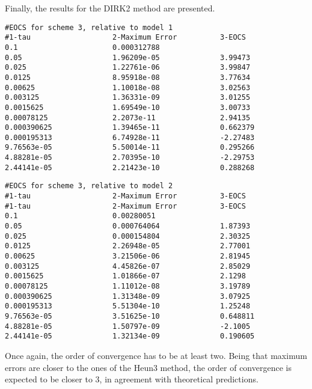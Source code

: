 \documentclass[11pt]{article}
\theoremstyle{theorem}
\theoremstyle{definition}
\begin{document}
Finally, the results for the DIRK2 method are presented.\\

\begin{lstlisting}
#EOCS for scheme 3, relative to model 1
#1-tau                   2-Maximum Error          3-EOCS                   
0.1                      0.000312788              	
0.05                     1.96209e-05              3.99473
0.025                    1.22761e-06              3.99847
0.0125                   8.95918e-08              3.77634
0.00625                  1.10018e-08              3.02563
0.003125                 1.36331e-09              3.01255
0.0015625                1.69549e-10              3.00733
0.00078125               2.2073e-11               2.94135
0.000390625              1.39465e-11              0.662379
0.000195313              6.74928e-11              -2.27483
9.76563e-05              5.50014e-11              0.295266
4.88281e-05              2.70395e-10              -2.29753
2.44141e-05              2.21423e-10              0.288268
\end{lstlisting}

\begin{lstlisting}
#EOCS for scheme 3, relative to model 2
#1-tau                   2-Maximum Error          3-EOCS                   
#1-tau                   2-Maximum Error          3-EOCS                   
0.1                      0.00280051               	
0.05                     0.000764064              1.87393
0.025                    0.000154804              2.30325
0.0125                   2.26948e-05              2.77001
0.00625                  3.21506e-06              2.81945
0.003125                 4.45826e-07              2.85029
0.0015625                1.01866e-07              2.1298
0.00078125               1.11012e-08              3.19789
0.000390625              1.31348e-09              3.07925
0.000195313              5.51304e-10              1.25248
9.76563e-05              3.51625e-10              0.648811
4.88281e-05              1.50797e-09              -2.1005
2.44141e-05              1.32134e-09              0.190605
\end{lstlisting}

Once again, the order of convergence has to be at least two. Being that maximum errors are closer to the ones of the Heun3 method, the order of convergence is expected to be closer to 3, in agreement with theoretical predictions.\\
\end{document}
